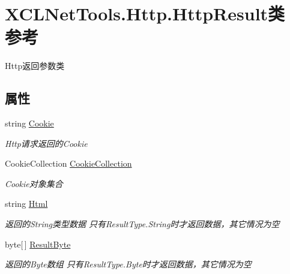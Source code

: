 \hypertarget{class_x_c_l_net_tools_1_1_http_1_1_http_result}{\section{X\-C\-L\-Net\-Tools.\-Http.\-Http\-Result类 参考}
\label{class_x_c_l_net_tools_1_1_http_1_1_http_result}
}


Http返回参数类  


\subsection*{属性}
\begin{DoxyCompactItemize}
\item 
string \hyperlink{class_x_c_l_net_tools_1_1_http_1_1_http_result_a2c37e2f1cd87f1a6ebb3120752019d6a}{Cookie}
\begin{DoxyCompactList}\small\item\em Http请求返回的\-Cookie \end{DoxyCompactList}\item 
Cookie\-Collection \hyperlink{class_x_c_l_net_tools_1_1_http_1_1_http_result_af9aca82ecce2ed0364caf3343fbba601}{Cookie\-Collection}
\begin{DoxyCompactList}\small\item\em Cookie对象集合 \end{DoxyCompactList}\item 
string \hyperlink{class_x_c_l_net_tools_1_1_http_1_1_http_result_a5f96bed917f8a3a43b9bc38695f5fb79}{Html}
\begin{DoxyCompactList}\small\item\em 返回的\-String类型数据 只有\-Result\-Type.\-String时才返回数据，其它情况为空 \end{DoxyCompactList}\item 
byte\mbox{[}$\,$\mbox{]} \hyperlink{class_x_c_l_net_tools_1_1_http_1_1_http_result_aca3f63e730af7bb4c40a345fc5d02423}{Result\-Byte}
\begin{DoxyCompactList}\small\item\em 返回的\-Byte数组 只有\-Result\-Type.\-Byte时才返回数据，其它情况为空 \end{DoxyCompactList}\item 

\end{DoxyCompactItemize}
